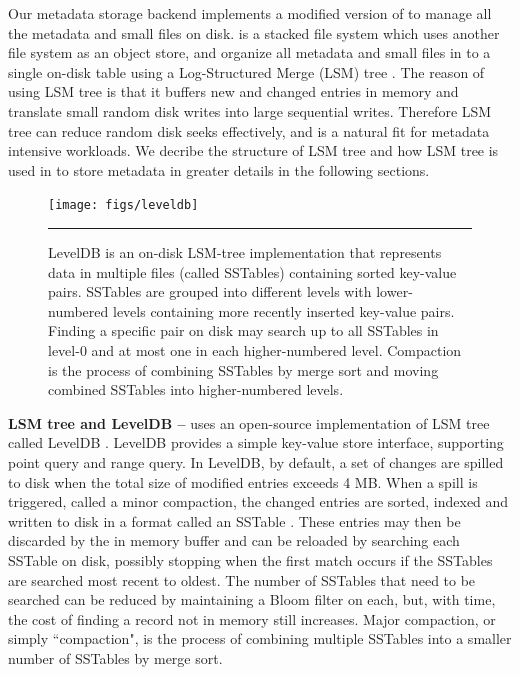 Our metadata storage backend implements a modified version of \tfs
to manage all the metadata and small files on disk.
\tfs \cite{TableFS} is a stacked file system which uses another file system
as an object store, and organize all metadata and small files in to a single
on-disk table using a Log-Structured Merge (LSM) tree \cite{ONeil1996}.
The reason of using LSM tree is that it buffers new and changed entries in
memory and translate small random disk writes into large sequential writes.
Therefore LSM tree can reduce random disk seeks effectively, and is a natural
fit for metadata intensive workloads. We decribe the structure of LSM tree
and how LSM tree is used in \tfs to store metadata in greater details
in the following sections.

\begin{figure}[t]
\texttt{[image: figs/leveldb]}
\vspace{10pt}
\caption{\textsf{\footnotesize
LevelDB is an on-disk LSM-tree implementation that represents data in multiple 
files (called SSTables) containing sorted key-value pairs.
SSTables are grouped into different levels with lower-numbered levels
containing more recently inserted key-value pairs.
Finding a specific pair on disk may search up to all SSTables in level-0
and at most one in each higher-numbered level.
Compaction is the process of combining SSTables
by merge sort and moving combined SSTables into higher-numbered levels.
}}
\hrule
\label{fig:leveldb}
\end{figure}


\textbf{LSM tree and LevelDB --}
\tfs uses an open-source implementation of LSM tree called LevelDB
\cite{LevelDB}. LevelDB provides a simple key-value store interface,
supporting point query and range query. In LevelDB, by default,
a set of changes are spilled to disk when the total size of modified
entries exceeds 4 MB.  When a spill is triggered, called a
minor compaction, the changed entries are sorted, indexed and written to disk
in a format called an SSTable \cite{BigTable}.  These entries may then be
discarded by the in memory buffer and can be reloaded by searching each SSTable
on disk, possibly stopping when the first match occurs if the SSTables are
searched most recent to oldest.  The number of SSTables that need to be
searched can be reduced by maintaining a Bloom filter\cite{bloomfilter} on each,
but, with time, the cost of finding a record not in memory still increases.
Major compaction, or simply ``compaction",
is the process of combining multiple SSTables
into a smaller number of SSTables by merge sort.

